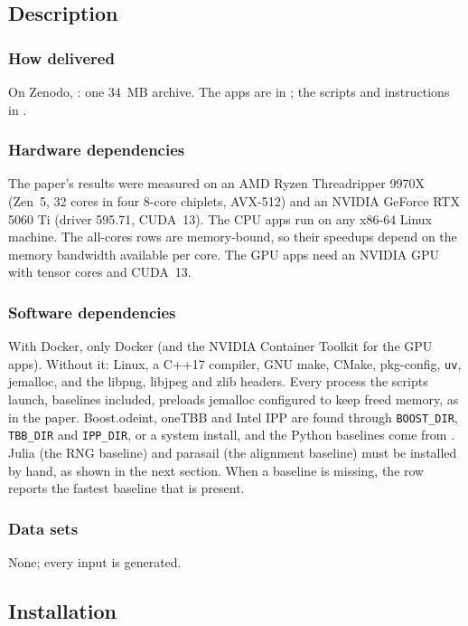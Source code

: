 \subsection{Description}

\subsubsection{How delivered}
On Zenodo, \artifactdoi: one 34~MB archive. The apps are in ;
the scripts and instructions in .

\subsubsection{Hardware dependencies}
The paper's results were measured on an AMD Ryzen Threadripper 9970X (Zen~5,
32 cores in four 8-core chiplets, AVX-512) and an NVIDIA GeForce RTX 5060 Ti
(driver 595.71, CUDA~13). The CPU apps run on any x86-64 Linux machine. The all-cores rows are
memory-bound, so their speedups depend on the memory bandwidth available per
core. The GPU apps need an NVIDIA GPU with tensor cores and CUDA~13.

\subsubsection{Software dependencies}
With Docker, only Docker (and the NVIDIA Container Toolkit for the GPU
apps). Without it: Linux, a C++17 compiler, GNU make, CMake, pkg-config,
\texttt{uv}, jemalloc, and the libpng, libjpeg and zlib headers. Every process the scripts
launch, baselines included, preloads jemalloc configured to keep freed memory,
as in the paper. Boost.odeint, oneTBB and Intel IPP are found through
\texttt{BOOST\_DIR}, \texttt{TBB\_DIR} and \texttt{IPP\_DIR}, or a system
install, and the Python baselines come from
. Julia (the RNG baseline) and
parasail (the alignment baseline) must be installed by hand, as shown in the
next section. When a baseline is missing, the row reports the fastest
baseline that is present.

\subsubsection{Data sets}
None; every input is generated.

\subsection{Installation}

